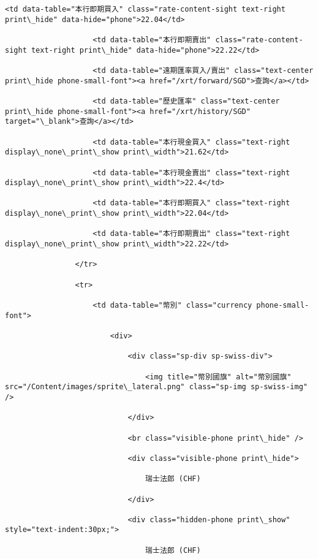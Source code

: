 \documentclass[11pt]{article}
\begin{document}
\begin{Verbatim}[commandchars=\\\{\}]
                    <td data-table="本行即期買入" class="rate-content-sight text-right print\_hide" data-hide="phone">22.04</td>

                    <td data-table="本行即期賣出" class="rate-content-sight text-right print\_hide" data-hide="phone">22.22</td>

                    <td data-table="遠期匯率買入/賣出" class="text-center print\_hide phone-small-font"><a href="/xrt/forward/SGD">查詢</a></td>

                    <td data-table="歷史匯率" class="text-center print\_hide phone-small-font"><a href="/xrt/history/SGD" target="\_blank">查詢</a></td>

                    <td data-table="本行現金買入" class="text-right display\_none\_print\_show print\_width">21.62</td>

                    <td data-table="本行現金賣出" class="text-right display\_none\_print\_show print\_width">22.4</td>

                    <td data-table="本行即期買入" class="text-right display\_none\_print\_show print\_width">22.04</td>

                    <td data-table="本行即期賣出" class="text-right display\_none\_print\_show print\_width">22.22</td>

                </tr>

                <tr>

                    <td data-table="幣別" class="currency phone-small-font">

                        <div>

                            <div class="sp-div sp-swiss-div">

                                <img title="幣別國旗" alt="幣別國旗" src="/Content/images/sprite\_lateral.png" class="sp-img sp-swiss-img" />

                            </div>

                            <br class="visible-phone print\_hide" />

                            <div class="visible-phone print\_hide">

                                瑞士法郎 (CHF)

                            </div>

                            <div class="hidden-phone print\_show" style="text-indent:30px;">

                                瑞士法郎 (CHF)


\end{Verbatim}
\end{document}

